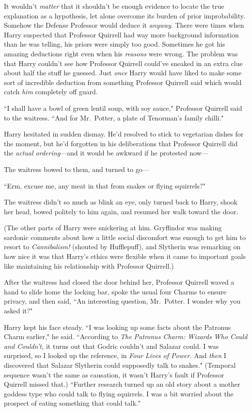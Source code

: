 It wouldn't \emph{matter} that it shouldn't be enough evidence to locate the true explanation as a hypothesis, let alone overcome its burden of prior improbability. Somehow the Defense Professor would deduce it \emph{anyway}. There were times when Harry suspected that Professor Quirrell had way more background information than he was telling, his priors were simply too good. Sometimes he got his amazing deductions right even when his \emph{reasons} were wrong. The problem was that Harry couldn't see how Professor Quirrell could've sneaked in an extra clue about half the stuff he guessed. Just \emph{once} Harry would have liked to make some sort of incredible deduction from something Professor Quirrell said which would catch \emph{him} completely off guard.

\later

``I shall have a bowl of green lentil soup, with soy sauce," Professor Quirrell said to the waitress. ``And for Mr.~Potter, a plate of Tenorman's family chilli."

Harry hesitated in sudden dismay. He'd resolved to stick to vegetarian dishes for the moment, but he'd forgotten in his deliberations that Professor Quirrell did the \emph{actual ordering}—and it would be awkward if he protested now—

The waitress bowed to them, and turned to go—

``Erm, excuse me, any meat in that from snakes or flying squirrels?"

The waitress didn't so much as blink an eye, only turned back to Harry, shook her head, bowed politely to him again, and resumed her walk toward the door.

(The other parts of Harry were snickering at him. Gryffindor was making sardonic comments about how a little social discomfort was enough to get him to resort to \emph{Cannibalism!} (shouted by Hufflepuff), and Slytherin was remarking on how nice it was that Harry's ethics were flexible when it came to important goals like maintaining his relationship with Professor Quirrell.)

After the waitress had closed the door behind her, Professor Quirrell waved a hand to slide home the locking bar, spoke the usual four Charms to ensure privacy, and then said, ``An interesting question, Mr.~Potter. I wonder why you asked it?"

Harry kept his face steady. ``I was looking up some facts about the Patronus Charm earlier," he said. ``According to \emph{The Patronus Charm: Wizards Who Could and Couldn't,} it turns out that Godric couldn't and Salazar could. I was surprised, so I looked up the reference, in \emph{Four Lives of Power.} And \emph{then} I discovered that Salazar Slytherin could supposedly talk to snakes." (Temporal sequence wasn't the same as causation, it wasn't Harry's fault if Professor Quirrell missed that.) ``Further research turned up an old story about a mother goddess type who could talk to flying squirrels. I was a bit worried about the prospect of eating something that could talk."

